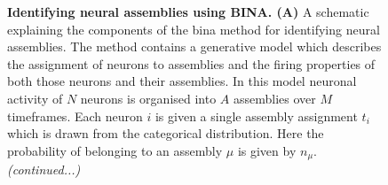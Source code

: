 \begin{figure}[!ht]
        \captionsetup{}
        \centering
            \caption[\label{fig:R1_F4} \textbf{Identifying neural assemblies using BINA.}] {\label{fig:R1_F4} \textbf{Identifying neural assemblies using BINA. (A)} A schematic explaining the components of the \gls{bina} method for identifying neural assemblies. The method contains a generative model which describes the assignment of neurons to assemblies and the firing properties of both those neurons and their assemblies. In this model neuronal activity of $N$ neurons is organised into $A$ assemblies over $M$ timeframes. Each neuron $i$ is given a single assembly assignment $t_{i}$ which is drawn from the categorical distribution. Here the probability of belonging to an assembly $\mu$ is given by $n_{\mu}$. \textit{(continued...)}}
            \end{figure}
            \clearpage
